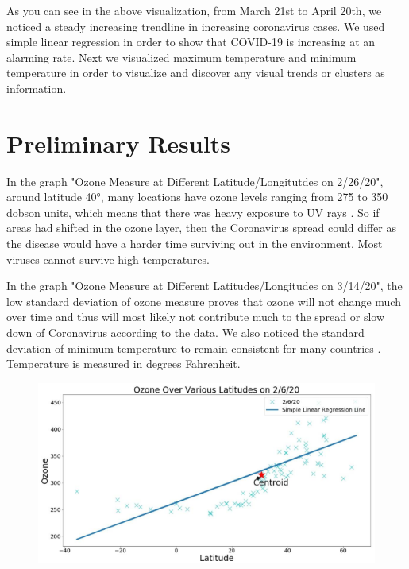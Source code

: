 \documentclass[10pt,journal,compsoc]{IEEEtran}
\begin{document}
{{	As you can see in the above visualization, from March 21st to April 20th, we noticed a steady increasing trendline in increasing coronavirus cases. We used simple linear regression in order to show that COVID-19 is increasing at an alarming rate. Next we visualized maximum temperature and minimum temperature in order to visualize and discover any visual trends or clusters as information. 

\section{Preliminary Results}\label{sec:preliminary results}

	In the graph "Ozone Measure at Different Latitude/Longitutdes on 2/26/20", around latitude 40°, many locations have ozone levels ranging from 275 to 350 dobson units, which means that there was heavy exposure to UV rays . So if areas had shifted in the ozone layer, then the Coronavirus spread could differ as the disease would have a harder time surviving out in the environment. Most viruses cannot survive high temperatures. 

	In the graph "Ozone Measure at Different Latitudes/Longitudes on 3/14/20", the low standard deviation of ozone measure proves that ozone will not change much over time and thus will most likely not contribute much to the spread or slow down of Coronavirus according to the data. We also noticed the standard deviation of minimum temperature to remain consistent for many countries . Temperature is measured in degrees Fahrenheit.

\begin{figure}[!htbp] %
	\includegraphics[scale=0.6]{ozone-feb-centroid.png}\\ 
	\centering
	\label{LP-COVID-Ozone February 26th}
\end{figure}

}}
\end{document}
